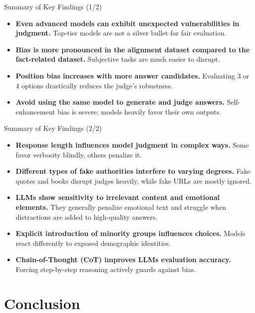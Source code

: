 \documentclass[10pt]{beamer}
\begin{document}
\begin{frame}{Summary of Key Findings (1/2)}
  \begin{itemize}
      \item \textbf{Even advanced models can exhibit unexpected vulnerabilities in judgment.} Top-tier models are not a silver bullet for fair evaluation.
      \item \textbf{Bias is more pronounced in the alignment dataset compared to the fact-related dataset.} Subjective tasks are much easier to disrupt.
      \item \textbf{Position bias increases with more answer candidates.} Evaluating 3 or 4 options drastically reduces the judge's robustness.
      \item \textbf{Avoid using the same model to generate and judge answers.} Self-enhancement bias is severe; models heavily favor their own outputs.
  \end{itemize}
\end{frame}

\begin{frame}{Summary of Key Findings (2/2)}
  \begin{itemize}
      \item \textbf{Response length influences model judgment in complex ways.} Some favor verbosity blindly, others penalize it.
      \item \textbf{Different types of fake authorities interfere to varying degrees.} Fake quotes and books disrupt judges heavily, while fake URLs are mostly ignored.
      \item \textbf{LLMs show sensitivity to irrelevant content and emotional elements.} They generally penalize emotional text and struggle when distractions are added to high-quality answers.
      \item \textbf{Explicit introduction of minority groups influences choices.} Models react differently to exposed demographic identities.
      \item \textbf{Chain-of-Thought (CoT) improves LLMs evaluation accuracy.} Forcing step-by-step reasoning actively guards against bias.
  \end{itemize}
\end{frame}

\section{Conclusion}
\end{document}
